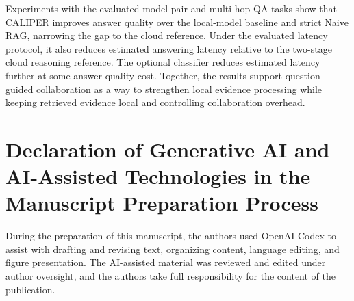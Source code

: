 \documentclass[a4paper,fleqn]{cas-dc}
\begin{document}
Experiments with the evaluated model pair and multi-hop QA tasks show that CALIPER improves answer quality over the local-model baseline and strict Naive RAG, narrowing the gap to the cloud reference. Under the evaluated latency protocol, it also reduces estimated answering latency relative to the two-stage cloud reasoning reference. The optional classifier reduces estimated latency further at some answer-quality cost. Together, the results support question-guided collaboration as a way to strengthen local evidence processing while keeping retrieved evidence local and controlling collaboration overhead.

\section*{Declaration of Generative AI and AI-Assisted Technologies in the Manuscript Preparation Process}
During the preparation of this manuscript, the authors used OpenAI Codex to assist with drafting and revising text, organizing content, language editing, and figure presentation. The AI-assisted material was reviewed and edited under author oversight, and the authors take full responsibility for the content of the publication.

\FloatBarrier
\renewcommand{\bibfont}{\fontsize{8pt}{9.5pt}\selectfont}


\end{document}
